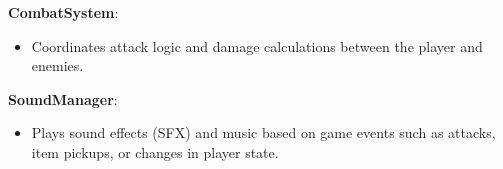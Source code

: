 \textbf{CombatSystem}:
\begin{itemize}
	\item Coordinates attack logic and damage calculations between the player and enemies.
\end{itemize}

\textbf{SoundManager}:
\begin{itemize}
	\item Plays sound effects (SFX) and music based on game events such as attacks, item pickups, or changes in player state.
	\end{itemize}

